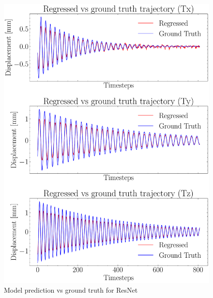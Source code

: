\begin{figure}[H]
    \centering
    \includegraphics[scale=0.6]{images/fig_chapter4/nn_related/predicted_vs_ground_truth_resnet.pdf}
    \caption{Model prediction vs ground truth for ResNet}
    \label{fig:resnet_op_vs_gt}
\end{figure}

